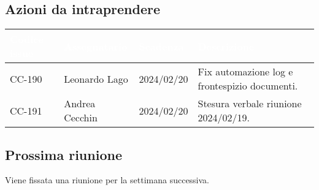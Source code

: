 \subsection{Azioni da intraprendere}
{
    \setlength{\tabcolsep}{10pt}
            \renewcommand{\arraystretch}{1.5}
            \begin{xltabular}{\textwidth}{| l | l | l | X |}
                 \hline
                 \textbf{\textcolor{white}{Codice issue}} & \textbf{\textcolor{white}{Assegnatario}} & \textbf{\textcolor{white}{Scadenza}} & \textbf{\textcolor{white}{Descrizione}} \\
                 \hline
                 CC-190 & Leonardo Lago & 2024/02/20 & Fix automazione log e frontespizio documenti.\\
                 \hline
                 CC-191 & Andrea Cecchin & 2024/02/20 & Stesura verbale riunione 2024/02/19.\\
                 \hline
                 
            \end{xltabular}
}

\subsection{Prossima riunione} \label{subsec:riunione}
Viene fissata una riunione per la settimana successiva.
